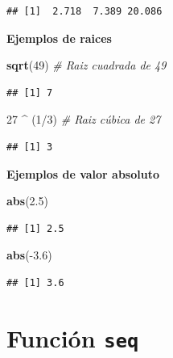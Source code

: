 \documentclass[10pt,]{krantz}
\makeatletter
\newenvironment{Shaded}{\begin{snugshade}}{\end{snugshade}}
\newcommand{\KeywordTok}[1]{\textcolor[rgb]{0.13,0.29,0.53}{\textbf{{#1}}}}
\newcommand{\DecValTok}[1]{\textcolor[rgb]{0.00,0.00,0.81}{{#1}}}
\newcommand{\FloatTok}[1]{\textcolor[rgb]{0.00,0.00,0.81}{{#1}}}
\newcommand{\StringTok}[1]{\textcolor[rgb]{0.31,0.60,0.02}{{#1}}}
\newcommand{\CommentTok}[1]{\textcolor[rgb]{0.56,0.35,0.01}{\textit{{#1}}}}
\newcommand{\NormalTok}[1]{{#1}}
\newenvironment{kframe}{%
\medskip{}
\setlength{\fboxsep}{.8em}
 \def\at@end@of@kframe{}%
 \ifinner\ifhmode%
  \def\at@end@of@kframe{\end{minipage}}%
  \begin{minipage}{\columnwidth}%
 \fi\fi%
 \def\FrameCommand##1{\hskip\@totalleftmargin \hskip-\fboxsep
 \colorbox{shadecolor}{##1}\hskip-\fboxsep
     \hskip-\linewidth \hskip-\@totalleftmargin \hskip\columnwidth}%
 \MakeFramed {\advance\hsize-\width
   \@totalleftmargin\z@ \linewidth\hsize
   \@setminipage}}%
 {\par\unskip\endMakeFramed%
 \at@end@of@kframe}
\renewenvironment{Shaded}{\begin{kframe}}{\end{kframe}}
\makeatother
\begin{document}
\begin{verbatim}
## [1]  2.718  7.389 20.086
\end{verbatim}

\textbf{Ejemplos de raices}

\begin{Shaded}
\begin{Highlighting}[]
\KeywordTok{sqrt}\NormalTok{(}\DecValTok{49}\NormalTok{)  }\CommentTok{# Raiz cuadrada de 49}
\end{Highlighting}
\end{Shaded}

\begin{verbatim}
## [1] 7
\end{verbatim}

\begin{Shaded}
\begin{Highlighting}[]
\DecValTok{27} \NormalTok{^}\StringTok{ }\NormalTok{(}\DecValTok{1}\NormalTok{/}\DecValTok{3}\NormalTok{)  }\CommentTok{# Raiz cúbica de 27}
\end{Highlighting}
\end{Shaded}

\begin{verbatim}
## [1] 3
\end{verbatim}

\textbf{Ejemplos de valor absoluto}

\begin{Shaded}
\begin{Highlighting}[]
\KeywordTok{abs}\NormalTok{(}\FloatTok{2.5}\NormalTok{)}
\end{Highlighting}
\end{Shaded}

\begin{verbatim}
## [1] 2.5
\end{verbatim}

\begin{Shaded}
\begin{Highlighting}[]
\KeywordTok{abs}\NormalTok{(-}\FloatTok{3.6}\NormalTok{)}
\end{Highlighting}
\end{Shaded}

\begin{verbatim}
## [1] 3.6
\end{verbatim}

\section{\texorpdfstring{Función \texttt{seq} 
}{Función seq  }}\label{funcion-seq}
\end{document}
